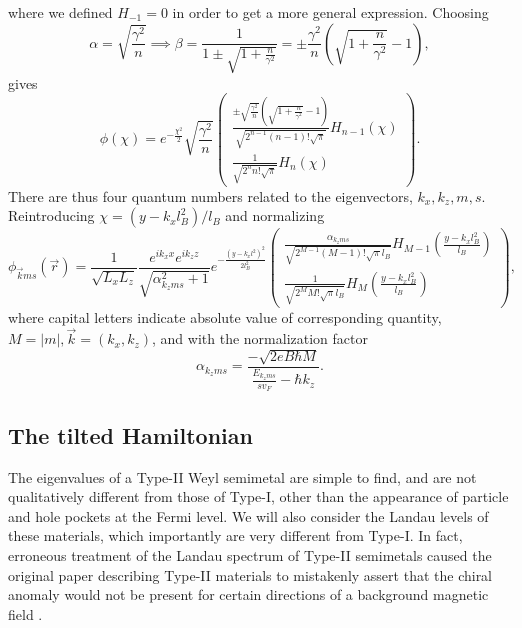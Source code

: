 where we defined \( H_{-1} = 0 \) in order to get a more general expression.
Choosing
\begin{equation}
  \alpha  = \sqrt{\frac{\gamma^2}{n}} \implies \beta = \frac{1}{1 \pm \sqrt{1 + \frac{n}{\gamma ^2}}} = \pm \frac{\gamma ^2}{n} \left( \sqrt{1 + \frac{n}{\gamma ^2}} - 1 \right),
\end{equation}
gives
\begin{equation}
  \phi (\chi ) = e^{-\frac{\chi^2}{2}} \sqrt{\frac{\gamma ^2}{n}}
  \begin{pmatrix}
    \frac{
      \pm \sqrt{\frac{\gamma ^2}{n}} \left( \sqrt{1 + \frac{n}{\gamma ^2}} - 1 \right)
    }{
      \sqrt{2^{n-1} (n-1)! \sqrt{\pi }}
    }
    H_{n-1}(\chi )\\
    \frac{1}{\sqrt{2^{n}n!\sqrt{\pi }}} H_n \left(\chi \right)
  \end{pmatrix}.
\end{equation}
There are thus four quantum numbers related to the eigenvectors, $k_x,  k_z, m, s$.
Reintroducing $\chi = (y-k_xl_B^2) /l_B$ and normalizing
\begin{equation}
  \phi _{\vec{k} m s}(\vec{r}) = \frac{1}{\sqrt{L_xL_z}}
  \frac{e^{ik_x x}e^{ik_z z}}{\sqrt{\alpha_{k_z m s}^2 + 1}}
  e^{-\frac{\left(y-k_x l^2\right)^2}{2 l_B^2}}
  \begin{pmatrix}
    \frac{\alpha_{k_z m s}}{\sqrt{2^{M-1} (M-1)! \sqrt{\pi } l_B}} H_{M-1}\left( \frac{y-k_x l_B^2}{l_B} \right)\\
    \frac{1}{\sqrt{2^M M! \sqrt{\pi } l_B}} H_M \left( \frac{y-k_x l_B^2}{l_B} \right)
  \end{pmatrix},
\end{equation}
where capital letters indicate absolute value of corresponding quantity, $M=|m|, \vec{k} = (k_x, k_z)$, and with the normalization factor
\begin{equation}
  \alpha_{k_z m s} = \frac{-\sqrt{2eB\hbar M}}{\frac{E_{k_z m s}}{s v_{F}} - \hbar  k_z}.
\end{equation}

\subsection{The tilted Hamiltonian}

The eigenvalues of a Type-II Weyl semimetal are simple to find, and are not qualitatively different from those of Type-I, other than the appearance of particle and hole pockets at the Fermi level.
We will also consider the Landau levels of these materials, which importantly are very different from Type-I.
In fact, erroneous treatment of the Landau spectrum of Type-II semimetals caused the original paper describing Type-II materials to mistakenly assert that the chiral anomaly would not be present for certain directions of a background magnetic field \cite{soluyanovTypeIIWeylSemimetals2015}\cite{sharmaChiralAnomalyLongitudinal2017}.

